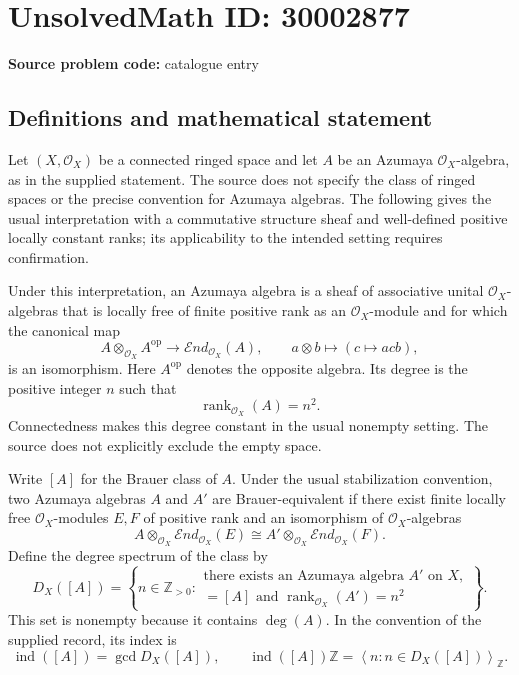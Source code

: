\documentclass[11pt]{article}
\newcommand{\Z}{\mathbb{Z}}
\begin{document}
\section*{UnsolvedMath ID: 30002877}
\textbf{Source problem code:} catalogue entry
\subsection{Definitions and mathematical statement}
Let \((X,\mathcal O_X)\) be a connected ringed space and let \(A\) be an Azumaya \(\mathcal O_X\)-algebra, as in the supplied statement. The source does not specify the class of ringed spaces or the precise convention for Azumaya algebras. The following gives the usual interpretation with a commutative structure sheaf and well-defined positive locally constant ranks; its applicability to the intended setting requires confirmation.

Under this interpretation, an Azumaya algebra is a sheaf of associative unital \(\mathcal O_X\)-algebras that is locally free of finite positive rank as an \(\mathcal O_X\)-module and for which the canonical map
\[
 A\otimes_{\mathcal O_X}A^{\mathrm{op}}
 \longrightarrow \mathcal E nd_{\mathcal O_X}(A),
 \qquad a\otimes b\longmapsto (c\longmapsto acb),
\]
is an isomorphism. Here \(A^{\mathrm{op}}\) denotes the opposite algebra. Its degree is the positive integer \(n\) such that
\[
 \operatorname{rank}_{\mathcal O_X}(A)=n^2.
\]
Connectedness makes this degree constant in the usual nonempty setting. The source does not explicitly exclude the empty space.

Write \([A]\) for the Brauer class of \(A\). Under the usual stabilization convention, two Azumaya algebras \(A\) and \(A'\) are Brauer-equivalent if there exist finite locally free \(\mathcal O_X\)-modules \(E,F\) of positive rank and an isomorphism of \(\mathcal O_X\)-algebras
\[
 A\otimes_{\mathcal O_X}\mathcal E nd_{\mathcal O_X}(E)
 \cong
 A'\otimes_{\mathcal O_X}\mathcal E nd_{\mathcal O_X}(F).
\]
Define the degree spectrum of the class by
\[
 D_X([A])=
 \left\{n\in\Z_{>0}:\begin{array}{l}
 \text{there exists an Azumaya algebra }A'\text{ on }X,\\
 [A']=[A]\text{ and }\operatorname{rank}_{\mathcal O_X}(A')=n^2
 \end{array}\right\}.
\]
This set is nonempty because it contains \(\deg(A)\). In the convention of the supplied record, its index is
\[
 \operatorname{ind}([A])=\gcd D_X([A]),
 \qquad
 \operatorname{ind}([A])\Z
 =\left\langle n:n\in D_X([A])\right\rangle_{\Z}.
\]
\end{document}

